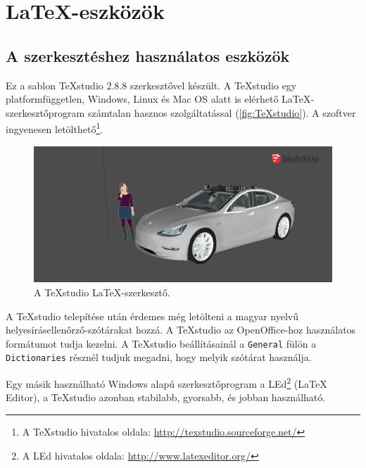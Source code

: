 \chapter{\LaTeX-eszközök}
\label{sec:LatexTools}
\section{A szerkesztéshez használatos eszközök}
Ez a sablon TeXstudio 2.8.8 szerkesztővel készült. A TeXstudio egy
platformfüggetlen, Windows, Linux és Mac OS alatt is elérhető
\LaTeX-szerkesztőprogram számtalan hasznos szolgáltatással
(\autoref{fig:TeXstudio}). A szoftver ingyenesen letölthető\footnote{A
TeXstudio hivatalos oldala: \url{http://texstudio.sourceforge.net/}}.

\begin{figure}[!ht]
\centering
\includegraphics[width=150mm, keepaspectratio]{figures/3dmodel1.png}
\caption{A TeXstudio \LaTeX-szerkesztő.}
\label{fig:TeXstudio}
\end{figure}

A TeXstudio telepítése után érdemes még letölteni a magyar nyelvű
helyesírásellenőrző-szótárakat hozzá. A TeXstudio az OpenOffice-hoz használatos
formátumot tudja kezelni. A TeXstudio beállításainál a \verb+General+ fülön a
\verb+Dictionaries+ résznél tudjuk megadni, hogy melyik szótárat használja.

Egy másik használható Windows alapú szerkesztőprogram a LEd\footnote{A LEd
hivatalos oldala: \url{http://www.latexeditor.org/}} (LaTeX Editor), a TeXstudio
azonban stabilabb, gyorsabb, és jobban használható.

